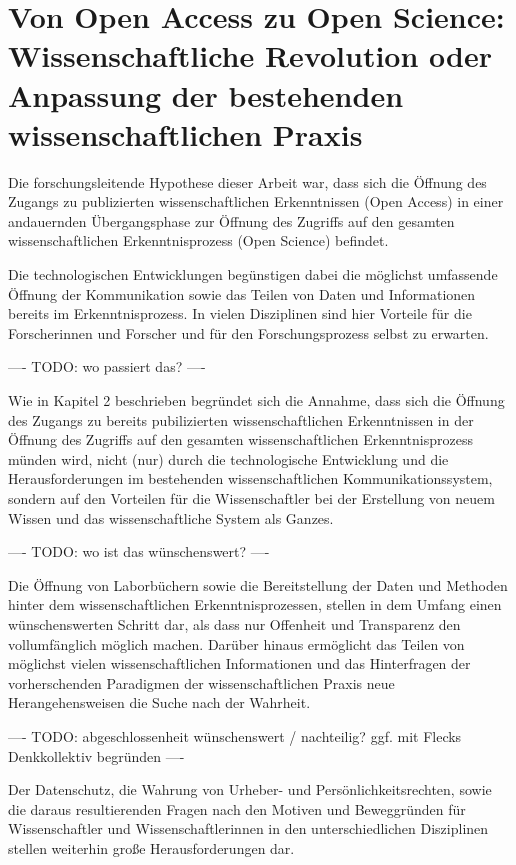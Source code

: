 \section{Von Open Access zu Open Science: Wissenschaftliche Revolution oder Anpassung der bestehenden wissenschaftlichen Praxis}

Die forschungsleitende Hypothese dieser Arbeit war, dass sich die Öffnung des Zugangs zu publizierten wissenschaftlichen Erkenntnissen (Open Access) in einer andauernden Übergangsphase zur Öffnung des Zugriffs auf den gesamten wissenschaftlichen Erkenntnisprozess (Open Science) befindet.

Die technologischen Entwicklungen begünstigen dabei die möglichst umfassende Öffnung der Kommunikation sowie das Teilen von Daten und Informationen bereits im Erkenntnisprozess. In vielen Disziplinen sind hier Vorteile für die Forscherinnen und Forscher und für den Forschungsprozess selbst zu erwarten.

---- TODO: wo passiert das? ----

Wie in Kapitel 2 beschrieben begründet sich die Annahme, dass sich die Öffnung des Zugangs zu bereits pubilizierten wissenschaftlichen Erkenntnissen in der Öffnung des Zugriffs auf den gesamten wissenschaftlichen Erkenntnisprozess münden wird, nicht (nur) durch die technologische Entwicklung und die Herausforderungen im bestehenden wissenschaftlichen Kommunikationssystem, sondern auf den Vorteilen für die Wissenschaftler bei der Erstellung von neuem Wissen und das wissenschaftliche System als Ganzes.

---- TODO: wo ist das wünschenswert? ----

Die Öffnung von Laborbüchern sowie die Bereitstellung der Daten und Methoden hinter dem wissenschaftlichen Erkenntnisprozessen, stellen in dem Umfang einen wünschenswerten Schritt dar, als dass nur Offenheit und Transparenz den vollumfänglich möglich machen. Darüber hinaus ermöglicht das Teilen von möglichst vielen wissenschaftlichen Informationen und das Hinterfragen der vorherschenden Paradigmen der wissenschaftlichen Praxis neue Herangehensweisen die Suche nach der Wahrheit.

---- TODO: abgeschlossenheit wünschenswert / nachteilig? ggf. mit Flecks Denkkollektiv begründen ----

Der Datenschutz, die Wahrung von Urheber- und Persönlichkeitsrechten, sowie die daraus resultierenden Fragen nach den Motiven und Beweggründen für Wissenschaftler und Wissenschaftlerinnen in den unterschiedlichen Disziplinen stellen weiterhin große Herausforderungen dar.

